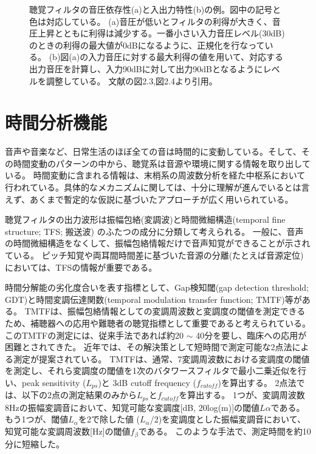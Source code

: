 \begin{figure}[h]
\begin{minipage}[t]{0.5\hsize}
        \label{fig:Basic_IOfunc}
    \end{minipage}
    \label{compression}
    \caption{聴覚フィルタの音圧依存性(a)と入出力特性(b)の例。図中の記号と色は対応している。
            (a)音圧が低いとフィルタの利得が大きく、音圧上昇とともに利得は減少する。一番小さい入力音圧レベル(30dB)のときの利得の最大値が0dBになるように、正規化を行なっている。
            (b)図(a)の入力音圧に対する最大利得の値を用いて、対応する出力音圧を計算し、入力90dBに対して出力90dBとなるようにレベルを調整している。
              文献\cite{yamamoto2023GESI}の図2.3,図2.4より引用。}
\end{figure}

\newpage




\clearpage
\section{時間分析機能}
音声や音楽など、日常生活のほぼ全ての音は時間的に変動している。そして、その時間変動のパターンの中から、聴覚系は音源や環境に関する情報を取り出している。
時間変動に含まれる情報は、末梢系の周波数分析を経た中枢系において行われている。具体的なメカニズムに関しては、十分に理解が進んでいるとは言えず、あくまで暫定的な仮説に基づいたアプローチが広く用いられている。

聴覚フィルタの出力波形は振幅包絡(変調波)と時間微細構造(temporal fine structure; TFS; 搬送波) のふたつの成分に分類して考えられる。
一般に、音声の時間微細構造をなくして、振幅包絡情報だけで音声知覚ができることが示されている。
ピッチ知覚や両耳間時間差に基づいた音源の分離(たとえば音源定位)においては、TFSの情報が重要である。

時間分解能の劣化度合いを表す指標として、Gap検知閾(gap detection threshold; GDT)と時間変調伝達関数(temporal modulation transfer function; TMTF)等がある。
TMTFは、振幅包絡情報としての変調周波数と変調度の閾値を測定できるため、補聴器への応用や難聴者の聴覚指標として重要であると考えられている。
このTMTFの測定には、従来手法であれば約20 $\sim$ 40分を要し、臨床への応用が困難とされてきた。
近年では、その解決策として短時間で測定可能な2点法による測定が提案されている\cite{morimoto2019Two-PointTMTF}。
TMTFは、通常、7変調周波数における変調度の閾値を測定し、それら変調度の閾値を1次のバタワースフィルタで最小二乗近似を行い、peak sensitivity ($L_{ps}$)と 3dB cutoff frequency ($f_{cutoff}$)を算出する。
2点法では、以下の2点の測定結果のみから$L_{ps}$と$f_{cutoff}$を算出する。
1つが、変調周波数8Hzの振幅変調音において、知覚可能な変調度[dB, 20log(m)]の閾値$L{\alpha}$である。
もう1つが、閾値$L_{\alpha}$を2で除した値 ($L_{\alpha}$/2)を変調度とした振幅変調音において、知覚可能な変調周波数[Hz]の閾値$f_{\beta}$である。
このような手法で、測定時間を約10分に短縮した。

